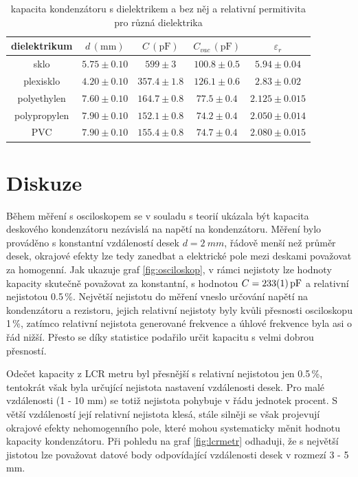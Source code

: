 \documentclass{../concepts/prepareprotokol} %
\begin{document}
\begin{table}[hbt]
\centering
\caption{kapacita kondenzátoru s dielektrikem a bez něj a relativní permitivita pro různá dielektrika}
\begin{tabular}{ccccc}
 \toprule
 dielektrikum & $d\, (\mathrm{mm})$ & $C\, (\mathrm{pF})$ & $C_{vac}\, (\mathrm{pF})$ & $\varepsilon_r$ \\
 \midrule
 sklo & $5.75 \pm 0.10$ & $599 \pm 3$ & $100.8 \pm 0.5$ & $5.94 \pm 0.04$ \\
 plexisklo & $4.20 \pm 0.10$ & $357.4 \pm 1.8$ & $126.1 \pm 0.6$ & $2.83 \pm 0.02$ \\
 polyethylen & $7.60 \pm 0.10$ & $164.7 \pm 0.8$ & $77.5 \pm 0.4$ & $2.125 \pm 0.015$ \\        
 polypropylen & $7.90 \pm 0.10$ & $152.1 \pm 0.8$ & $74.2 \pm 0.4$ & $2.050 \pm 0.014$ \\       
 PVC & $7.90 \pm 0.10$ & $155.4 \pm 0.8$ & $74.7 \pm 0.4$ & $2.080 \pm 0.015$ \\
 \bottomrule
\end{tabular}
\label{tab:dielektrika}
\end{table}

\section{Diskuze}

Během měření s osciloskopem se v souladu s teorií ukázala být kapacita deskového kondenzátoru nezávislá na napětí na kondenzátoru. Měření bylo prováděno s konstantní vzdáleností desek $d = \SI{2}{mm}$, řádově menší než průměr desek, okrajové efekty lze tedy zanedbat a elektrické pole mezi deskami považovat za homogenní. Jak ukazuje graf \ref{fig:osciloskop}, v rámci nejistoty lze hodnoty kapacity skutečně považovat za konstantní, s hodnotou $C = \SI{233\pm1}{pF}$ a relativní nejistotou 0.5\,\%. Největší nejistotu do měření vneslo určování napětí na kondenzátoru a rezistoru, jejich relativní nejistoty byly kvůli přesnosti osciloskopu 1\,\%, zatímco relativní nejistota generované frekvence a úhlové frekvence byla asi o řád nižší. Přesto se díky statistice podařilo určit kapacitu s velmi dobrou přesností.

Odečet kapacity z LCR metru byl přesnější s relativní nejistotou jen 0.5\,\%, tentokrát však byla určující nejistota nastavení vzdálenosti desek. Pro malé vzdálenosti (1 - 10 mm) se totiž nejistota pohybuje v řádu jednotek procent. S větší vzdáleností její relativní nejistota klesá, stále silněji se však projevují okrajové efekty nehomogenního pole, které mohou systematicky měnit hodnotu kapacity kondenzátoru. Při pohledu na graf \ref{fig:lcrmetr} odhaduji, že s největší jistotou lze považovat datové body odpovídající vzdálenosti desek v rozmezí 3 - 5 mm.
\end{document}
